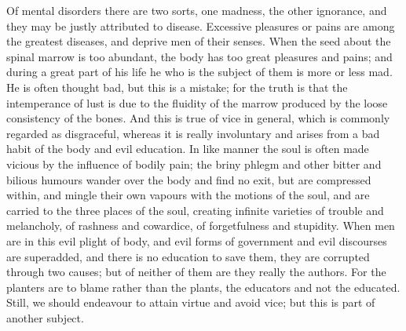Of mental disorders there are two sorts, one madness, the other ignorance,
and they may be justly attributed to disease. Excessive pleasures or pains
are among the greatest diseases, and deprive men of their senses. When the
seed about the spinal marrow is too abundant, the body has too great
pleasures and pains; and during a great part of his life he who is the
subject of them is more or less mad. He is often thought bad, but this is
a mistake; for the truth is that the intemperance of lust is due to the
fluidity of the marrow produced by the loose consistency of the bones. And
this is true of vice in general, which is commonly regarded as
disgraceful, whereas it is really involuntary and arises from a bad habit
of the body and evil education. In like manner the soul is often made
vicious by the influence of bodily pain; the briny phlegm and other bitter
and bilious humours wander over the body and find no exit, but are
compressed within, and mingle their own vapours with the motions of the
soul, and are carried to the three places of the soul, creating infinite
varieties of trouble and melancholy, of rashness and cowardice, of
forgetfulness and stupidity. When men are in this evil plight of body, and
evil forms of government and evil discourses are superadded, and there is
no education to save them, they are corrupted through two causes; but of
neither of them are they really the authors. For the planters are to blame
rather than the plants, the educators and not the educated. Still, we
should endeavour to attain virtue and avoid vice; but this is part of
another subject.

